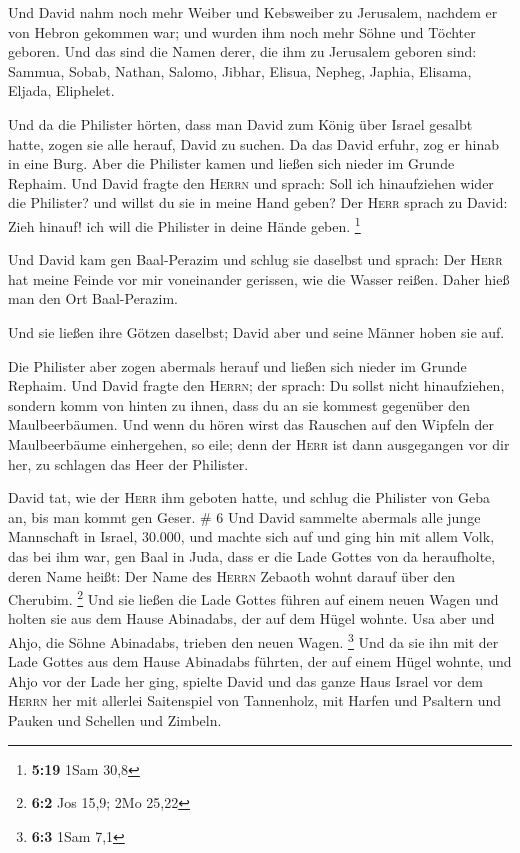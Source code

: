  Und David nahm noch mehr Weiber und Kebsweiber zu
Jerusalem, nachdem er von Hebron gekommen war; und wurden ihm noch mehr
Söhne und Töchter geboren.  Und das sind die Namen derer,
die ihm zu Jerusalem geboren sind: Sammua, Sobab, Nathan, Salomo,
 Jibhar, Elisua, Nepheg, Japhia,  Elisama,
Eljada, Eliphelet.

 Und da die Philister hörten, dass man David zum König
über Israel gesalbt hatte, zogen sie alle herauf, David zu suchen. Da
das David erfuhr, zog er hinab in eine Burg.  Aber die
Philister kamen und ließen sich nieder im Grunde Rephaim.
 Und David fragte den \textsc{Herrn} und sprach: Soll ich
hinaufziehen wider die Philister? und willst du sie in meine Hand geben?
Der \textsc{Herr} sprach zu David: Zieh hinauf! ich will die Philister
in deine Hände geben. \footnote{\textbf{5:19} 1Sam 30,8}

 Und David kam gen Baal-Perazim und schlug sie daselbst
und sprach: Der \textsc{Herr} hat meine Feinde vor mir voneinander
gerissen, wie die Wasser reißen. Daher hieß man den Ort Baal-Perazim.

 Und sie ließen ihre Götzen daselbst; David aber und
seine Männer hoben sie auf.

 Die Philister aber zogen abermals herauf und ließen sich
nieder im Grunde Rephaim.  Und David fragte den
\textsc{Herrn}; der sprach: Du sollst nicht hinaufziehen, sondern komm
von hinten zu ihnen, dass du an sie kommest gegenüber den
Maulbeerbäumen.  Und wenn du hören wirst das Rauschen auf
den Wipfeln der Maulbeerbäume einhergehen, so eile; denn der
\textsc{Herr} ist dann ausgegangen vor dir her, zu schlagen das Heer der
Philister.

 David tat, wie der \textsc{Herr} ihm geboten hatte, und
schlug die Philister von Geba an, bis man kommt gen Geser. \# 6
 Und David sammelte abermals alle junge Mannschaft in
Israel, 30.000,  und machte sich auf und ging hin mit
allem Volk, das bei ihm war, gen Baal in Juda, dass er die Lade Gottes
von da heraufholte, deren Name heißt: Der Name des \textsc{Herrn}
Zebaoth wohnt darauf über den Cherubim. \footnote{\textbf{6:2} Jos 15,9;
  2Mo 25,22}  Und sie ließen die Lade Gottes führen auf
einem neuen Wagen und holten sie aus dem Hause Abinadabs, der auf dem
Hügel wohnte. Usa aber und Ahjo, die Söhne Abinadabs, trieben den neuen
Wagen. \footnote{\textbf{6:3} 1Sam 7,1}  Und da sie ihn
mit der Lade Gottes aus dem Hause Abinadabs führten, der auf einem Hügel
wohnte, und Ahjo vor der Lade her ging,  spielte David und
das ganze Haus Israel vor dem \textsc{Herrn} her mit allerlei
Saitenspiel von Tannenholz, mit Harfen und Psaltern und Pauken und
Schellen und Zimbeln.

